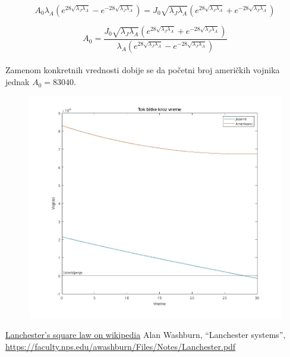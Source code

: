 \documentclass{article}
\newcommand{\laj}{\sqrt{\lambda_J\lambda_A}}
\begin{document}
\[
  A_0 \lambda_A (e^{28 \laj} - e^{-28 \laj})
=
  J_0 \laj(e^{28 \laj} + e^{-28 \laj})
\]

\[
  A_0 =
  \frac{J_0 \laj(e^{28 \laj} + e^{-28 \laj})}
  {\lambda_A (e^{28 \laj} - e^{-28 \laj})}
\]
\\
Zamenom konkretnih vrednosti dobije se da početni broj američkih vojnika
jednak \(A_0 = 83040\). \\

\begin{figure}[htbp]
    \center
    \includegraphics[scale=0.35]{img/bitka28.jpg}
    
\end{figure}



\begin{thebibliography}{1}
    \href{https://en.wikipedia.org/wiki/Lanchester's_laws}
         {Lanchester's square law on wikipedia}
    Alan Washburn,
    ``Lanchester systems'',
    \url{https://faculty.nps.edu/awashburn/Files/Notes/Lanchester.pdf}
\end{thebibliography}

\end{document}
